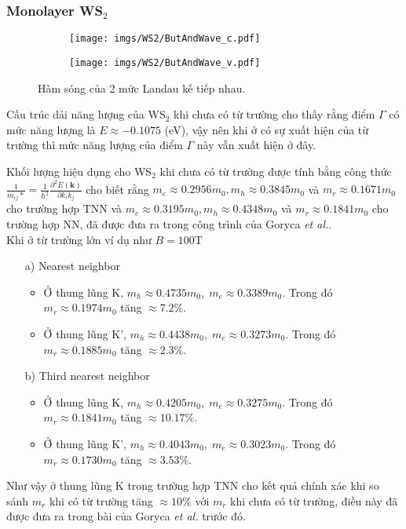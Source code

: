 \documentclass{article}
\begin{document}
\newpage
\subsubsection*{Monolayer WS$_{2}$}
\begin{figure}[htb]
	\begin{subfigure}{0.495\textwidth}
		\centering
		\texttt{[image: imgs/WS2/ButAndWave\_c.pdf]}
	\end{subfigure}
	\begin{subfigure}{0.495\textwidth}
		\centering
		\texttt{[image: imgs/WS2/ButAndWave\_v.pdf]}
	\end{subfigure}
	\caption{Hàm sóng của 2 mức Landau kế tiếp nhau.}
\end{figure}

Cấu trúc dải năng lượng của WS$_{2}$ khi chưa có từ trường cho thấy rằng điểm $\Gamma$ có mức năng lượng là $E \approx -0.1075$ (eV), vậy nên khi ở có sự xuất hiện của từ trường thì mức năng lượng của điểm $\Gamma$ này vẫn xuất hiện ở đây. 

Khối lượng hiệu dụng cho WS$_{2}$ khi chưa có từ trường được tính bằng công thức $\frac{1}{m_{ij}*} =\frac{1}{\hbar^{2}} \frac{\partial^{2} E(\mathbf{k})}{\partial k_{i} k_{j}}$ cho biết rằng $m_{e} \approx 0.2956 m_{0}, m_{h} \approx 0.3845 m_{0}$ và $m_{r} \approx 0.1671 m_{0}$ cho trường hợp TNN và $m_{e} \approx 0.3195 m_{0}, m_{h} \approx 0.4348 m_{0}$ và $m_{r} \approx 0.1841 m_{0}$ cho trường hợp NN, đã được đưa ra trong công trình của Goryca \textit{et al.}\cite{goryca2019}. \\
Khi ở từ trường lớn ví dụ như $B = 100 $T
\begin{itemize}
	\item[a)] Nearest neighbor
	\begin{itemize}
		\item Ở thung lũng K, $m_{h} \approx 0.4735 m_{0},\; m_{e} \approx 0.3389 m_{0}$. 
		Trong đó $m_{r} \approx 0.1974 m_{0}$ tăng $\approx 7.2\%$.
		
		\item Ở thung lũng K', $m_{h} \approx 0.4438 m_{0},\; m_{e} \approx 0.3273 m_{0}$. 
		Trong đó $m_{r} \approx 0.1885 m_{0}$ tăng $\approx 2.3\%$.
	\end{itemize}
	\item[b)] Third nearest neighbor
	\begin{itemize}
		\item Ở thung lũng K, $m_{h} \approx 0.4205 m_{0},\; m_{e} \approx 0.3275 m_{0}$. 
		Trong đó $m_{r} \approx 0.1841 m_{0}$ tăng $\approx 10.17\%$.
		
		\item Ở thung lũng K', $m_{h} \approx 0.4043 m_{0},\; m_{e} \approx 0.3023 m_{0}$. 
		Trong đó $m_{r} \approx 0.1730 m_{0}$ tăng $\approx 3.53\%$.
	\end{itemize}
\end{itemize}
Như vậy ở thung lũng K trong trường hợp TNN cho kết quả chính xác khi so sánh $m_{r}$ khi có từ trường tăng $\approx 10\%$ với $m_{r}$ khi chưa có từ trường, điều này đã được đưa ra trong bài của Goryca \textit{et al.}\cite{goryca2019} trước đó.
\end{document}
